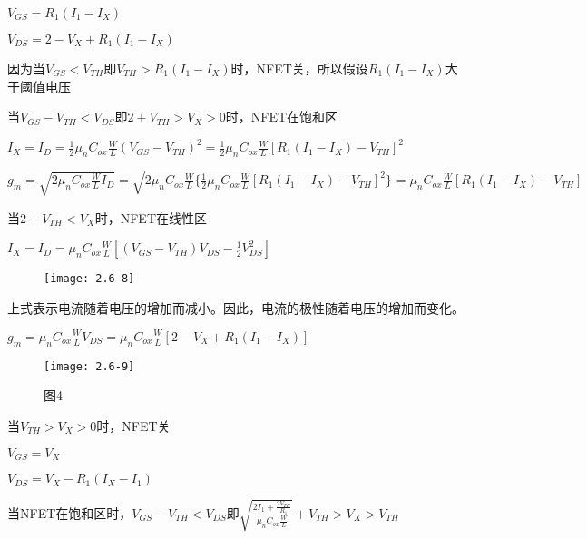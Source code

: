 {		\scalebox{3}{（d）}
	
		$V_{GS}=R_1(I_1-I_X)$
	
		$V_{DS}=2-V_{X}+R_1(I_1-I_X)$
		
		因为当$V_{GS}<V_{TH}$即$V_{TH}>R_1(I_1-I_X)$时，NFET关，所以假设$R_1(I_1-I_X)$大于阈值电压
	
		当$V_{GS}-V_{TH}<V_{DS}$即$2+V_{TH}>V_{X}>0$时，NFET在饱和区
	
	$I_X=I_D=\frac{1}{2}\mu_nC_{ox}\frac{W}{L}(V_{GS}-V_{TH})^2=\frac{1}{2}\mu_nC_{ox}\frac{W}{L}[R_1(I_1-I_X)-V_{TH}]^2$
	
	$g_m=\sqrt{2\mu_nC_{ox}\frac{W}{L}I_D}=\sqrt{2\mu_nC_{ox}\frac{W}{L}\{\frac{1}{2}\mu_nC_{ox}\frac{W}{L}[R_1(I_1-I_X)-V_{TH}]^2\}}=\mu_nC_{ox}\frac{W}{L}[R_1(I_1-I_X)-V_{TH}]$
	
	当$2+V_{TH}<V_{X}$时，NFET在线性区
	
	$I_X=I_D=\mu_nC_{ox}\frac{W}{L}[(V_{GS}-V_{TH})V_{DS}-\frac{1}{2}V_{DS}^2]$
	
			\begin{figure}[H] %
		\begin{minipage}{\linewidth}
			\texttt{[image: 2.6-8]}
		\end{minipage}
	\end{figure}
	
	上式表示电流随着电压的增加而减小。因此，电流的极性随着电压的增加而变化。
	
		$g_m=\mu_nC_{ox}\frac{W}{L}V_{DS}=\mu_nC_{ox}\frac{W}{L}[2-V_{X}+R_1(I_1-I_X)]$
	
			\begin{figure}[H] %
		\begin{minipage}{\linewidth}
			\texttt{[image: 2.6-9]}
		\end{minipage}
		\caption*{图4} %
	\end{figure}
	
			\scalebox{3}{（e）}
	
	当$V_{TH}>V_{X}>0$时，NFET关
	
	$V_{GS}=V_{X}$
	
	$V_{DS}=V_{X}-R_1(I_X-I_1)$
	
	当NFET在饱和区时，$V_{GS}-V_{TH}<V_{DS}$即$\sqrt{\frac{2I_1+\frac{2V_{TH}}{R_1}}{\mu_nC_{ox}\frac{W}{L}}}+V_{TH}>V_{X}>V_{TH}$
	
}

